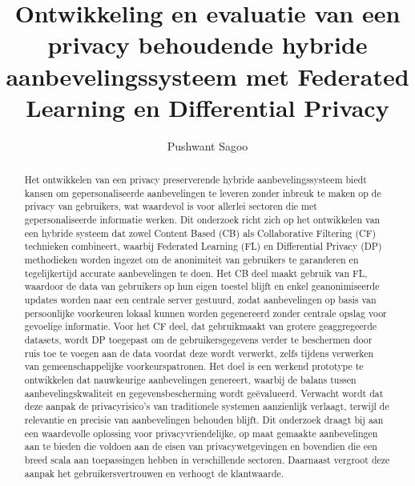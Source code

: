 \documentclass{hogent-article}
\title{Ontwikkeling en evaluatie van een privacy behoudende hybride aanbevelingssysteem met Federated Learning en Differential Privacy}
\author{Pushwant Sagoo}
\begin{document}
\begin{abstract}
  Het ontwikkelen van een privacy preserverende hybride aanbevelingssysteem biedt kansen om gepersonaliseerde aanbevelingen te leveren zonder inbreuk te maken op de privacy van gebruikers, wat waardevol is voor allerlei sectoren die met gepersonaliseerde informatie werken. Dit onderzoek richt zich op het ontwikkelen van een hybride systeem dat zowel Content Based (CB) als Collaborative Filtering (CF) technieken combineert, waarbij Federated Learning (FL) en Differential Privacy (DP) methodieken worden ingezet om de anonimiteit van gebruikers te garanderen en tegelijkertijd accurate aanbevelingen te doen. Het CB deel maakt gebruik van FL, waardoor de data van gebruikers op hun eigen toestel blijft en enkel geanonimiseerde updates worden naar een centrale server gestuurd, zodat aanbevelingen op basis van persoonlijke voorkeuren lokaal kunnen worden gegenereerd zonder centrale opslag voor gevoelige informatie. Voor het CF deel, dat gebruikmaakt van grotere geaggregeerde datasets, wordt DP toegepast om de gebruikersgegevens verder te beschermen door ruis toe te voegen aan de data voordat deze wordt verwerkt, zelfs tijdens verwerken van gemeenschappelijke voorkeurspatronen. Het doel is een werkend prototype te ontwikkelen dat nauwkeurige aanbevelingen genereert, waarbij de balans tussen aanbevelingskwaliteit en gegevensbescherming wordt geëvalueerd. Verwacht wordt dat deze aanpak de privacyrisico's van traditionele systemen aanzienlijk verlaagt, terwijl de relevantie en precisie van aanbevelingen behouden blijft. Dit onderzoek draagt bij aan een waardevolle oplossing voor privacyvriendelijke, op maat gemaakte aanbevelingen aan te bieden die voldoen aan de eisen van privacywetgevingen en bovendien die een breed scala aan toepassingen hebben in verschillende sectoren. Daarnaast vergroot deze aanpak het gebruikersvertrouwen en verhoogt de klantwaarde.
\end{abstract}

\tableofcontents



\printbibliography[heading=bibintoc]
\end{document}
